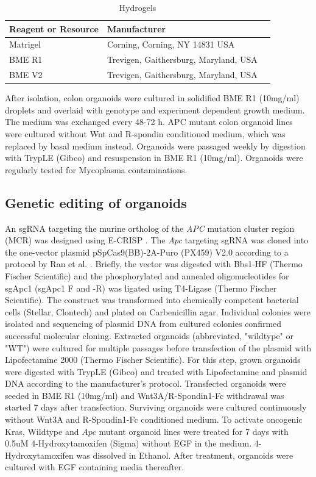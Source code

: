 \begin{flushleft}
\begin{table}[htb]
\caption{Hydrogels}
\label{tab:hydrogels} %
\begin{tabularx}{\textwidth}{XlX}
\toprule
\textbf{Reagent or Resource} & \textbf{Manufacturer} \\
\midrule
Matrigel & Corning, Corning, NY 14831 USA \\
BME R1 & Trevigen, Gaithersburg, Maryland, USA \\
BME V2 & Trevigen, Gaithersburg, Maryland, USA \\
\bottomrule
\end{tabularx}
\end{table}

After isolation, colon organoids were cultured in solidified BME R1 (10mg/ml) droplets and overlaid with genotype and experiment dependent growth medium. The medium was exchanged every 48-72 h. 
APC mutant colon organoid lines were cultured without Wnt and R-spondin conditioned medium, which was replaced by basal medium instead.
Organoids were passaged weekly by digestion with TrypLE (Gibco) and resuspension in BME R1 (10mg/ml). 
Organoids were regularly tested for Mycoplasma contaminations.  

\subsection{Genetic editing of organoids}
An sgRNA targeting the murine ortholog of the \textit{APC} mutation cluster region (MCR) was designed using E-CRISP \parencite{heigwerECRISPFastCRISPR2014}. The \textit{Apc} targeting sgRNA was cloned into the one-vector plasmid pSpCas9(BB)-2A-Puro (PX459) V2.0 according to a protocol by Ran et al. \parencite{ranGenomeEngineeringUsing2013}. Briefly, the vector was digested with Bbs1-HF (Thermo Fischer Scientific) and the phosphorylated and annealed oligonucleotides for sgApc1 (sgApc1 F and -R) was ligated using T4-Ligase (Thermo Fischer Scientific). The construct was transformed into chemically competent bacterial cells (Stellar, Clontech) and plated on Carbenicillin agar. Individual colonies were isolated and sequencing of plasmid DNA from cultured colonies confirmed successful molecular cloning.   
Extracted organoids (abbreviated, "wildtype" or "WT") were cultured for multiple passages before transfection of the plasmid with Lipofectamine 2000 (Thermo Fischer Scientific). For this step, grown organoids were digested with TrypLE (Gibco) and treated with Lipofectamine and plasmid DNA according to the manufacturer’s protocol. Transfected organoids were seeded in BME R1 (10mg/ml) and Wnt3A/R-Spondin1-Fc withdrawal was started 7 days after transfection. Surviving organoids were cultured continuously without Wnt3A and R-Spondin1-Fc conditioned medium.
To activate oncogenic Kras, Wildtype and $Apc$ mutant organoid lines were treated for 7 days with 0.5uM 4-Hydroxytamoxifen (Sigma) without EGF in the medium. 4-Hydroxytamoxifen was dissolved in Ethanol. After treatment, organoids were cultured with EGF containing media thereafter.


\end{flushleft}
